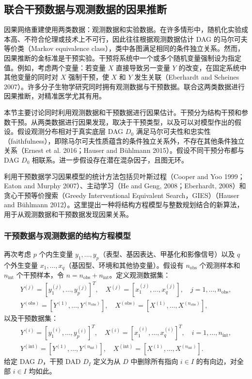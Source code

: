 \subsection{联合干预数据与观测数据的因果推断}

因果网络重建使用两类数据：观测数据和实验数据。在许多情形中，随机化实验成本高、不符合伦理或技术上不可行，因此往往根据观测数据估计 DAG 的马尔可夫等价类（Markov equivalence class），类中各图满足相同的条件独立关系。然而，因果推断的金标准是干预实验。干预将系统中一个或多个随机变量强制设为指定值。例如，考虑两个变量：若变量 $X$ 直接导致另一变量 $Y$ 的改变，在固定系统中其他变量的同时对 $X$ 强制干预，使 $X$ 和 $Y$ 发生关联（Eberhardt and Scheines 2007）。许多分子生物学研究同时拥有观测数据与干预数据。联合这两类数据进行因果推断，对精准医学尤其有用。

本节主要讨论同时利用观测数据和干预数据进行因果估计。干预分为结构干预和参数干预。从两类数据进行因果发现，取决于干预类型，以及可以对模型作出的假设。假设观测分布相对于真实底层 DAG $D_0$ 满足马尔可夫性和忠实性（faithfulness），即除马尔可夫性质蕴含的条件独立关系外，不存在其他条件独立关系（Ernest et al. 2016；Hauser and Bühlmann 2015）。假设不同干预分布都与 DAG $D_0$ 相联系。进一步假设存在潜在混杂因子，且图无环。

利用干预数据学习因果模型的统计方法包括贝叶斯过程（Cooper and Yoo 1999；Eaton and Murphy 2007）、主动学习（He and Geng, 2008；Eberhardt, 2008）和贪心干预等价搜索（Greedy Interventional Equivalent Search，GIES）（Hauser and Bühlmann 2012）。这里提出一种将结构方程模型与整数规划结合的新算法，用于从观测数据和干预数据发现因果关系。

\subsubsection{干预数据与观测数据的结构方程模型}

再次考虑 $p$ 个内生变量 $y_1,\ldots,y_p$（表型、基因表达、甲基化和影像信号）以及 $q$ 个外生变量 $x_1,\ldots,x_q$（基因型、环境和其他协变量）。假设有 $n_{\mathrm{obs}}$ 个观测样本和 $n_{\mathrm{int}}$ 个干预样本，令 $n=n_{\mathrm{obs}}+n_{\mathrm{int}}$。定义观测数据集：
\[
\begin{gathered}
Y^{(j)}=[y_1^{(j)},\ldots,y_p^{(j)}]^T,\quad
X^{(j)}=[x_1^{(j)},\ldots,x_q^{(j)}],\quad j=1,\ldots,n_{\mathrm{obs}},\\
Y^{(\mathrm{obs})}=[Y^{(1)},\ldots,Y^{(n_{\mathrm{obs}})}],
\quad
X^{(\mathrm{obs})}=[X^{(1)},\ldots,X^{(n_{\mathrm{obs}})}],
\end{gathered}
\]
以及干预数据集：
\[
\begin{gathered}
Y^{(i)}=[y_1^{(i)},\ldots,y_p^{(i)}]^T,\quad
X^{(i)}=[x_1^{(i)},\ldots,x_q^{(i)}]^T,\quad i=1,\ldots,n_{\mathrm{int}},\\
Y^{(\mathrm{int})}=[Y^{(1)},\ldots,Y^{(n_{\mathrm{int}})}],
\quad
X^{(\mathrm{int})}=[X^{(1)},\ldots,X^{(n_{\mathrm{int}})}].
\end{gathered}
\]
给定 DAG $D$，干预 DAD $D_I$ 定义为从 $D$ 中删除所有指向 $i\in I$ 的有向边，对全部 $i\in I$ 均如此。

